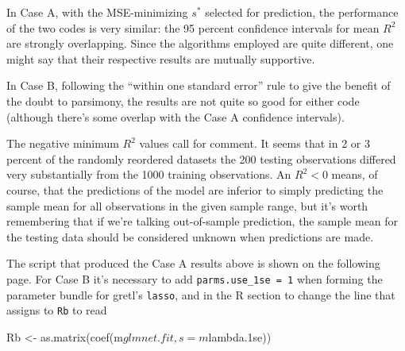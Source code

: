 \documentclass{article}
\begin{document}
In Case A, with the MSE-minimizing $s^*$ selected for prediction, the
performance of the two codes is very similar: the 95 percent
confidence intervals for mean $R^2$ are strongly overlapping.  Since
the algorithms employed are quite different, one might say that their
respective results are mutually supportive.

In Case B, following the ``within one standard error'' rule to give
the benefit of the doubt to parsimony, the results are not quite so
good for either code (although there's some overlap with the Case A
confidence intervals).

The negative minimum $R^2$ values call for comment. It seems that
in 2 or 3 percent of the randomly reordered datasets the 200
testing observations differed very substantially from the 1000
training observations. An $R^2 < 0$ means, of course, that the
predictions of the model are inferior to simply predicting the sample
mean for all observations in the given sample range, but it's worth
remembering that if we're talking out-of-sample prediction, the
sample mean for the testing data should be considered unknown when
predictions are made.

The script that produced the Case A results above is shown on the
following page. For Case B it's necessary to add
\texttt{parms.use\_1se = 1} when forming the parameter bundle for
gretl's \texttt{lasso}, and in the \textsf{R} section to change the
line that assigns to \texttt{Rb} to read
\begin{code}
Rb <- as.matrix(coef(m$glmnet.fit, s = m$lambda.1se))
\end{code}

\clearpage
\end{document}
